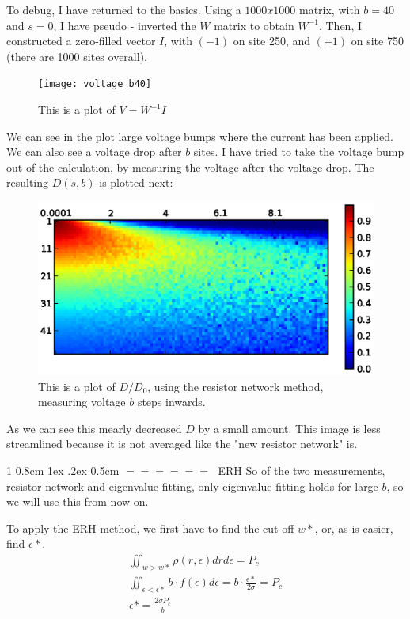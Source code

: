 \documentclass[onecolumn,fleqn,notitlepage,secnumarabic]{revtex4}
\makeatletter
\def\section{%
  \@startsection
    {section}%
    {1}%
    {\z@}%
    {0.8cm \@plus1ex \@minus .2ex}%
    {0.5cm}%
    {\Large\bf $=\!=\!=\!=\!=\!=\;$}%
}%
\makeatother
\begin{document}
To debug, I have returned to the basics. Using a $1000x1000$ matrix, with $b=40$ and $s=0$, I have pseudo - inverted the $W$ matrix to obtain $W^{-1}$. 
Then, I constructed a zero-filled vector $I$, with $(-1)$ on site 250, and $(+1)$ on site 750 (there are 1000 sites overall).
\begin{figure}[H]
\texttt{[image: voltage\_b40]}
\caption{This is a plot of $V=W^{-1}I$}
\end{figure} 
We can see in the plot large voltage bumps where the current has been applied. We can also see a voltage drop after $b$ sites. I have tried to take the voltage bump out of the calculation, by measuring the voltage after the voltage drop. The resulting $D(s,b)$ is plotted next:
\begin{figure}[H]
\includegraphics{resnet3}
\caption{This is a plot of $D/D_0$, using the resistor network method, measuring voltage $b$ steps inwards.}
\end{figure} 
As we can see this mearly decreased $D$ by a small amount. This image is less streamlined because it is not averaged like the "new resistor network" is.

\section{ERH}
So of the two measurements, resistor network and eigenvalue fitting, only eigenvalue fitting holds for large $b$, so we will use this from now on.

To apply the ERH method, we first have to find the cut-off $w*$, or, as is easier, find $\epsilon*$.
\begin{align}
\iint_{w>w*} \rho(r,\epsilon) dr d\epsilon = P_c \\
\iint_{\epsilon<\epsilon*} b\cdot f(\epsilon) d\epsilon = b\cdot\frac{\epsilon*}{2\sigma} = P_c\\
\epsilon* = \frac{2\sigma P_c}{b}
\end{align}
\end{document}
